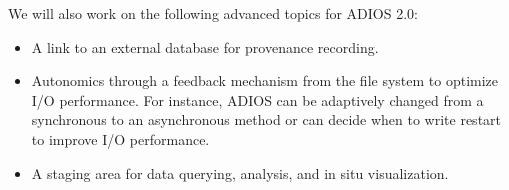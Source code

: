 We will also work on the following advanced topics for ADIOS 2.0: 

\begin{itemize}
\item
A link to an external database for provenance recording.

\item
Autonomics through a feedback mechanism from the file system 
to optimize I/O performance. For instance, ADIOS can be adaptively changed from 
a synchronous to an asynchronous method or can decide when to write restart to 
improve I/O performance.

\item
A staging area for data querying, analysis, and in situ visualization.\label{HToc84890220}\label{HToc212016595}\label{HToc212016837}\label{HToc182553328}

\end{itemize}